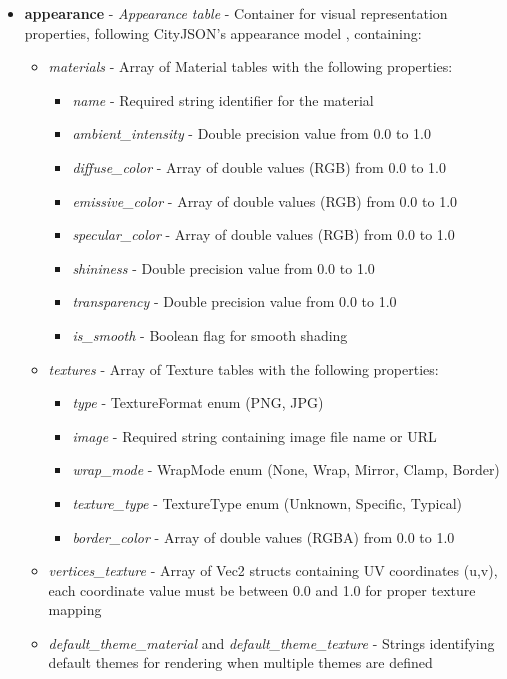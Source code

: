 \begin{itemize}
  \item \textbf{appearance} - \textit{Appearance table} - Container for visual representation properties, following CityJSON's appearance model \citep{cityjson_spec}, containing:
    \begin{itemize}
      \item \textit{materials} - Array of Material tables with the following properties:
        \begin{itemize}
          \item \textit{name} - Required string identifier for the material
          \item \textit{ambient\_intensity} - Double precision value from 0.0 to 1.0
          \item \textit{diffuse\_color} - Array of double values (RGB) from 0.0 to 1.0
          \item \textit{emissive\_color} - Array of double values (RGB) from 0.0 to 1.0
          \item \textit{specular\_color} - Array of double values (RGB) from 0.0 to 1.0
          \item \textit{shininess} - Double precision value from 0.0 to 1.0
          \item \textit{transparency} - Double precision value from 0.0 to 1.0
          \item \textit{is\_smooth} - Boolean flag for smooth shading
        \end{itemize}

      \item \textit{textures} - Array of Texture tables with the following properties:
        \begin{itemize}
          \item \textit{type} - TextureFormat enum (PNG, JPG)
          \item \textit{image} - Required string containing image file name or URL
          \item \textit{wrap\_mode} - WrapMode enum (None, Wrap, Mirror, Clamp, Border)
          \item \textit{texture\_type} - TextureType enum (Unknown, Specific, Typical)
          \item \textit{border\_color} - Array of double values (RGBA) from 0.0 to 1.0
        \end{itemize}

      \item \textit{vertices\_texture} - Array of Vec2 structs containing UV coordinates (u,v), each coordinate value must be between 0.0 and 1.0 for proper texture mapping

      \item \textit{default\_theme\_material} and \textit{default\_theme\_texture} - Strings identifying default themes for rendering when multiple themes are defined
    \end{itemize}
\end{itemize}

